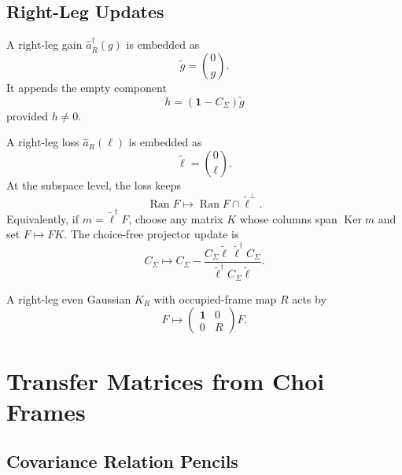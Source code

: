 \documentclass[aps,prb,onecolumn,nofootinbib,superscriptaddress]{revtex4-2}
\newcommand{\Id}{\mathbf{1}}
\newcommand{\Ran}{\operatorname{Ran}}
\newcommand{\Ker}{\operatorname{Ker}}
\newcommand{\ahat}{\hat a}
\begin{document}
\subsection{Right-Leg Updates}

A right-leg gain \(\ahat_R^\dagger(g)\) is embedded as
\begin{equation}
  \tilde g=\binom{0}{g}.
\end{equation}
It appends the empty component
\begin{equation}
  h=(\Id-C_\Sigma)\tilde g
\end{equation}
provided \(h\neq 0\).

A right-leg loss \(\ahat_R(\ell)\) is embedded as
\begin{equation}
  \tilde\ell=\binom{0}{\ell}.
\end{equation}
At the subspace level, the loss keeps
\begin{equation}
  \Ran F\longmapsto \Ran F\cap \tilde\ell^\perp .
  \label{eq:choi-loss-intersection}
\end{equation}
Equivalently, if \(m=\tilde\ell^\dagger F\), choose any matrix \(K\) whose
columns span \(\Ker m\) and set \(F\mapsto FK\).  The choice-free projector
update is
\begin{equation}
  C_\Sigma\longmapsto
  C_\Sigma
  -
  \frac{C_\Sigma\tilde\ell\,\tilde\ell^\dagger C_\Sigma}
       {\tilde\ell^\dagger C_\Sigma\tilde\ell}.
  \label{eq:choi-loss-projector}
\end{equation}

A right-leg even Gaussian \(K_R\) with occupied-frame map \(R\) acts by
\begin{equation}
  F\longmapsto
  \begin{pmatrix}
    \Id & 0\\
    0 & R
  \end{pmatrix}F.
  \label{eq:choi-even}
\end{equation}

\section{Transfer Matrices from Choi Frames}

\subsection{Covariance Relation Pencils}
\end{document}
